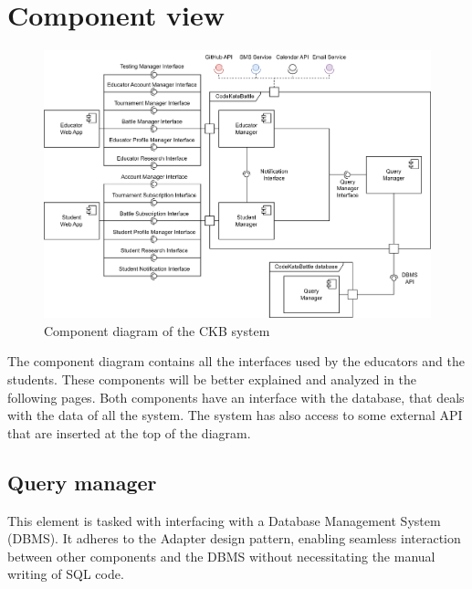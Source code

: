 \documentclass[12pt, a4paper]{report}
\begin{document}
    \section{Component view}
    \begin{figure}[H]
        \centering
        \includegraphics[width=1\linewidth]{images/component_view.png}
        \caption{Component diagram of the CKB system}
    \end{figure}
    The component diagram contains all the interfaces used by the educators and the students. 
    These components will be better explained and analyzed in the following pages. 
    Both components have an interface with the database, that deals with the data of all the system. 
    The system has also access to some external API that are inserted at the top of the diagram.  

    \subsection{Query manager}
    This element is tasked with interfacing with a Database Management System (DBMS). 
    It adheres to the Adapter design pattern, enabling seamless interaction between other components and the DBMS without necessitating the manual writing of SQL code.
\end{document}
